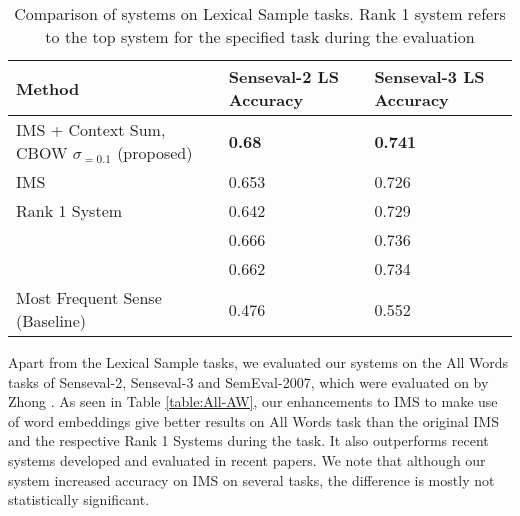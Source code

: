 \documentclass[11pt]{article}
\begin{document}
\begin{table}
	\caption{Comparison of systems on Lexical Sample tasks. Rank 1 system refers to the top system for the specified task during the evaluation}
	\label{table:top-LS}
	\begin{center}
		\begin{tabular}{| p{7cm} | p{4cm} | p{4cm} |}
			\hline
			Method & Senseval-2 LS Accuracy & Senseval-3 LS Accuracy \\
			\hline
			IMS + Context Sum, CBOW $\sigma _{=0.1}$ (proposed) & {\bf0.68} & {\bf0.741} \\
			\hline
			
			IMS & 0.653 & 0.726\\
			\hline
			Rank 1 System & 0.642 & 0.729 \\
			\hline
			\newcite{rothe2015autoextend} & 0.666 & 0.736 \\
			\hline
			\newcite{Taghipour15} & 0.662 & 0.734 \\
			\hline
			Most Frequent Sense (Baseline) & 0.476 & 0.552 \\
			\hline
		\end{tabular}
	\end{center}
\end{table}



Apart from the Lexical Sample tasks, we evaluated our systems on the All Words tasks of Senseval-2, Senseval-3 and SemEval-2007, which were evaluated on by Zhong . As seen in Table \ref{table:All-AW}, our enhancements to IMS to make use of word embeddings give better results on All Words task than the original IMS and the respective Rank 1 Systems during the task. It also outperforms recent systems developed and evaluated in recent papers. We note that although our system increased accuracy on IMS on several tasks, the difference is mostly not statistically significant. 
\end{document}
